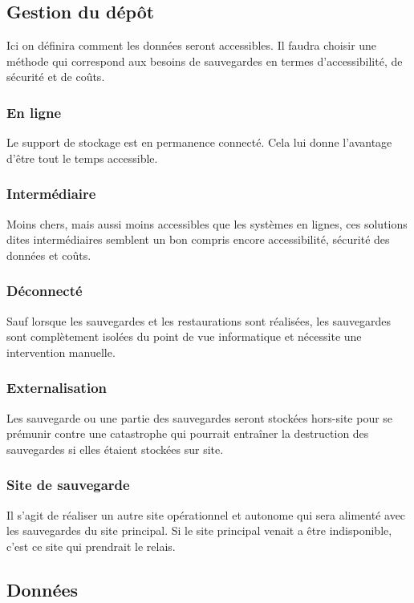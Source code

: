 \documentclass[a4paper,11pt]{report}
\begin{document}
\subsection{Gestion du dépôt}
Ici on définira comment les données seront accessibles.
Il faudra choisir une méthode qui correspond aux besoins de sauvegardes en termes d'accessibilité, de sécurité et de coûts.

\subsubsection{En ligne}
Le support de stockage est en permanence connecté. Cela lui donne l'avantage d'être tout le temps accessible.

\subsubsection{Intermédiaire}
Moins chers, mais aussi moins accessibles que les systèmes en lignes, ces solutions dites intermédiaires semblent un bon compris encore accessibilité, sécurité des données et coûts.

\subsubsection{Déconnecté}
Sauf lorsque les sauvegardes et les restaurations sont réalisées, les sauvegardes sont complètement isolées du point de vue informatique et nécessite une intervention manuelle.

\subsubsection{Externalisation}
Les sauvegarde ou une partie des sauvegardes seront stockées hors-site pour se prémunir contre une catastrophe qui pourrait entraîner la destruction des sauvegardes si elles étaient stockées sur site.

\subsubsection{Site de sauvegarde}
Il s'agit de réaliser un autre site opérationnel et autonome qui sera alimenté avec les sauvegardes du site principal.
Si le site principal venait a être indisponible, c'est ce site qui prendrait le relais.

\subsection{Données}
\end{document}
